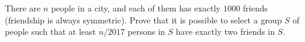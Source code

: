 There are $n$ people in a city, and each of them has exactly $1000$ friends (friendship is always symmetric). Prove that it is possible to select a group $S$ of people such that at least $n/2017$ persons in $S$ have exactly two friends in $S$.
